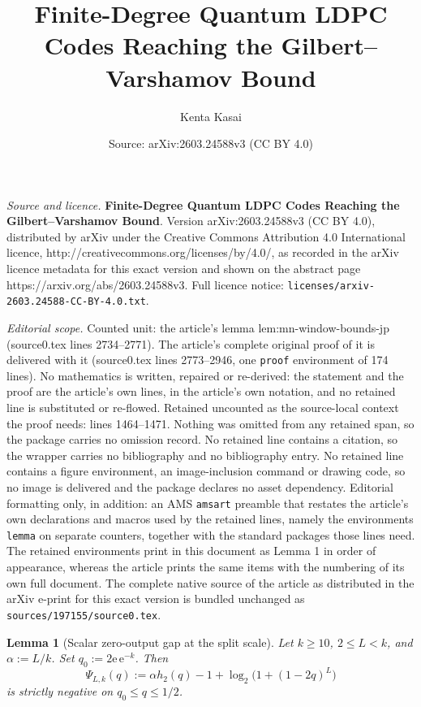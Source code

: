 \documentclass[10pt,a4paper]{amsart}
\title{\textbf{Finite-Degree Quantum LDPC Codes Reaching the Gilbert--Varshamov Bound}}
\author{Kenta Kasai}
\date{Source: arXiv:2603.24588v3 (CC BY 4.0)}
\newtheorem{lemma}{Lemma}
\newcommand{\h}{h_2}
\begin{document}
\maketitle

\noindent\emph{Source and licence.} \textbf{Finite-Degree Quantum LDPC Codes Reaching the Gilbert--Varshamov Bound}. Version arXiv:2603.24588v3 (CC BY 4.0), distributed by arXiv under the Creative Commons Attribution 4.0 International licence, http://creativecommons.org/licenses/by/4.0/, as recorded in the arXiv licence metadata for this exact version and shown on the abstract page https://arxiv.org/abs/2603.24588v3. Full licence notice: \texttt{licenses/arxiv-2603.24588-CC-BY-4.0.txt}.\par\smallskip

\noindent\textit{Editorial scope.} Counted unit: the article's lemma lem:mn-window-bounds-jp (source0.tex lines 2734--2771). The article's complete original proof of it is delivered with it (source0.tex lines 2773--2946, one \texttt{proof} environment of 174 lines). No mathematics is written, repaired or re-derived: the statement and the proof are the article's own lines, in the article's own notation, and no retained line is substituted or re-flowed.  Retained uncounted as the source-local context the proof needs: lines 1464--1471.  Nothing was omitted from any retained span, so the package carries no omission record.  No retained line contains a citation, so the wrapper carries no bibliography and no bibliography entry.  No retained line contains a figure environment, an image-inclusion command or drawing code, so no image is delivered and the package declares no asset dependency.  Editorial formatting only, in addition: an AMS \texttt{amsart} preamble that restates the article's own declarations and macros used by the retained lines, namely the environments \texttt{lemma} on separate counters, together with the standard packages those lines need.  The retained environments print in this document as Lemma 1 in order of appearance, whereas the article prints the same items with the numbering of its own full document.  The complete native source of the article as distributed in the arXiv e-print for this exact version is bundled unchanged as \texttt{sources/197155/source0.tex}.
\begin{lemma}[Scalar zero-output gap at the split scale]\label{lem:scalar-zero-output-gap-jp}
Let \(k\ge10\), \(2\le L<k\), and \(\alpha:=L/k\). Set \(q_0:=2\mathrm{e}\,\mathrm{e}^{-k}\). Then
\[
\Psi_{L,k}(q):=
\alpha\h(q)-1+\log_2\!\bigl(1+(1-2q)^L\bigr)
\]
is strictly negative on \(q_0\le q\le1/2\).
\end{lemma}
\end{document}
